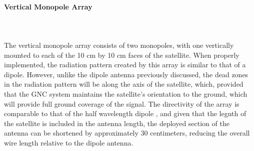 \paragraph{Vertical Monopole Array}~\\ ~\\
The vertical monopole array consists of two monopoles, with one vertically mounted to each of the 10 cm by 10 cm faces of the satellite. When properly implemented, the radiation pattern created by this array is similar to that of a dipole. However, unlike the dipole antenna previously discussed, the dead zones in the radiation pattern will be along the axis of the satellite, which, provided that the GNC system maintains the satellite's orientation to the ground, which will provide full ground coverage of the signal. The directivity of the array is comparable to that of the half wavelength dipole \cite{Dipole}, and given that the legnth of the satellite is included in the antenna length, the deployed section of the antenna can be shortened by approximately 30 centimeters, reducing the overall wire length relative to the dipole antenna.

